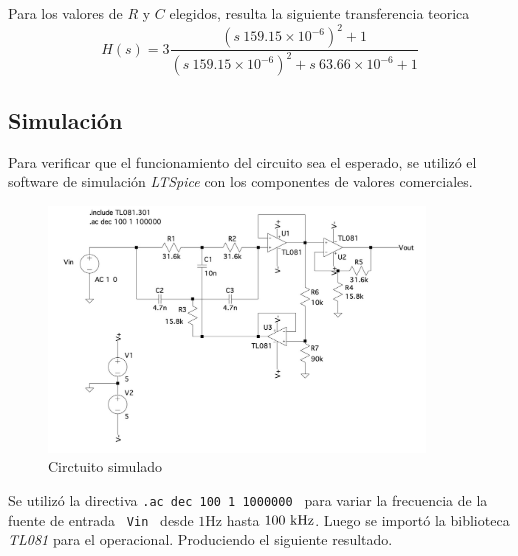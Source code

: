 Para los valores de $R$ y $C$ elegidos, resulta la siguiente transferencia teorica
\begin{equation}
  H(s)=3\frac{(s\ 159.15\times{10^{-6}})^2+1}{(s\ 159.15\times{10^{-6}})^2+s\ 63.66\times 10^{-6}+1}
\end{equation}


\subsection*{Simulaci\'on}
	Para verificar que el funcionamiento del circuito sea el esperado, se utiliz\'o el software de simulaci\'on \textit{LTSpice} con los componentes de valores comerciales. 
\begin{figure}[hbt]
	\centering
	\includegraphics[width=10cm]{imagenes/simulacion}
	\caption{Circtuito simulado}
\end{figure}

	
Se utiliz\'o la directiva \texttt{.ac dec 100 1 1000000 } para
variar la  frecuencia de la fuente de entrada \texttt{ Vin } desde  $1 \si{\hertz}$ hasta $100 \ \si{\kilo\hertz}$. Luego se import\'o la biblioteca \textit{TL081} para el operacional. Produciendo el siguiente resultado.

